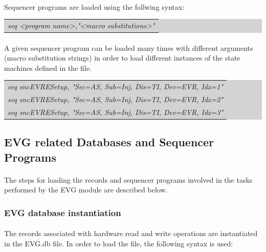 \documentclass[openany]{article}
\begin{document}
		\paragraph{} Sequencer programs are loaded using the follwing syntax:

		\bigskip
		\colorbox{lightgray}{
			\begin{tabularx}{0.9\textwidth}{X}
			\emph{seq \textless program name\textgreater,"\textless macro substitutions\textgreater"}
			\end{tabularx}
		}

		\paragraph{} A given sequencer program can be loaded many times with different arguments (macro substitution strings) in order to load different instances of the state machines defined in the file.

		\bigskip
		\colorbox{lightgray}{
			\begin{tabularx}{0.9\textwidth}{X}
			\emph{seq sncEVRESetup, "Sec=AS, Sub=Inj, Dis=TI, Dev=EVR, Idx=1"} \\
			\emph{seq sncEVRESetup, "Sec=AS, Sub=Inj, Dis=TI, Dev=EVR, Idx=2"} \\
			\emph{seq sncEVRESetup, "Sec=AS, Sub=Inj, Dis=TI, Dev=EVR, Idx=3"} \\
			\end{tabularx}
		}

	\subsection{EVG related Databases and Sequencer Programs}

		\paragraph{} The steps for loading the records and sequencer programs involved in the tasks performed by the EVG module are described below.

		\subsubsection{EVG database instantiation}

			\paragraph{} The records associated with hardware read and write operations are instantiated in the EVG.db file. In order to load the file, the following syntax is used:
\end{document}

